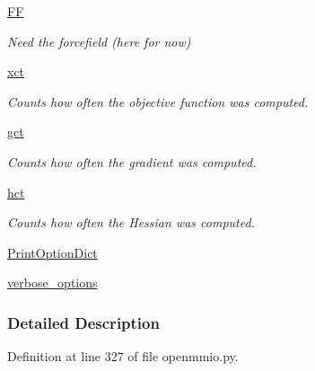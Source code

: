 \begin{DoxyCompactItemize}
\hyperlink{classforcebalance_1_1target_1_1Target_a38a37919783141ea37fdcf8b00ce0aaf}{F\-F}
\begin{DoxyCompactList}\small\item\em Need the forcefield (here for now) \end{DoxyCompactList}\item 
\hyperlink{classforcebalance_1_1target_1_1Target_aad2e385cfbf7b4a68f1c2cb41133fe82}{xct}
\begin{DoxyCompactList}\small\item\em Counts how often the objective function was computed. \end{DoxyCompactList}\item 
\hyperlink{classforcebalance_1_1target_1_1Target_aa625ac88c6744eb14ef281d9496d0dbb}{gct}
\begin{DoxyCompactList}\small\item\em Counts how often the gradient was computed. \end{DoxyCompactList}\item 
\hyperlink{classforcebalance_1_1target_1_1Target_a5b5a42f78052b47f29ed4b940c6111a1}{hct}
\begin{DoxyCompactList}\small\item\em Counts how often the Hessian was computed. \end{DoxyCompactList}\item 
\hyperlink{classforcebalance_1_1baseclass_1_1ForceBalanceBaseClass_a5c55e661e746d1a4443f4e0bc34ebe05}{Print\-Option\-Dict}
\item 
\hyperlink{classforcebalance_1_1baseclass_1_1ForceBalanceBaseClass_a8088e1e20cbd6bc175fb9c9fe9fa0f18}{verbose\-\_\-options}
\end{DoxyCompactItemize}


\subsubsection{Detailed Description}


Definition at line 327 of file openmmio.\-py.



